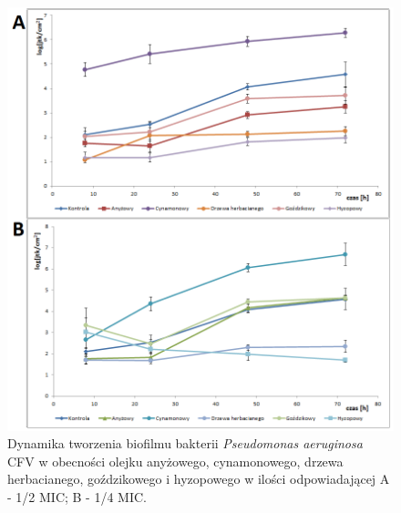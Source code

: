 \documentclass[11pt,a4paper]{report}
\begin{document}
\begin{figure}[!h]
\begin{center}
\includegraphics[scale=0.67]{img/cfv-a.png}
\caption{Dynamika tworzenia biofilmu bakterii \textit{Pseudomonas aeruginosa} CFV w obecności olejku anyżowego, cynamonowego, drzewa herbacianego, goździkowego i hyzopowego w ilości odpowiadającej A - 1/2 MIC; B - 1/4 MIC.}\label{cfv-a}
\end{center} 
\end{figure}
\end{document}
